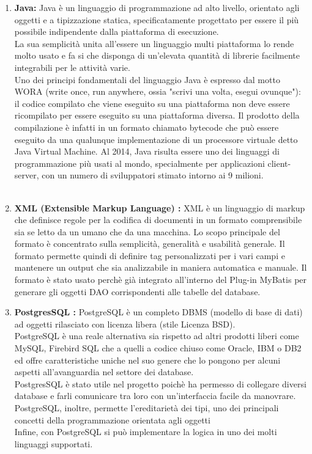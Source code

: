 \begin{enumerate}

\item \textbf{Java: }Java è un linguaggio di programmazione ad alto livello, orientato agli oggetti e a tipizzazione statica, specificatamente progettato per essere il più possibile indipendente dalla piattaforma di esecuzione.\\
La sua semplicità unita all'essere un linguaggio multi piattaforma lo rende molto usato e fa si che disponga di un'elevata quantità di librerie facilmente integrabili per le attività varie.\\
Uno dei principi fondamentali del linguaggio Java è espresso dal motto WORA (write once, run anywhere, ossia "scrivi una volta, esegui ovunque"): il codice compilato che viene eseguito su una piattaforma non deve essere ricompilato per essere eseguito su una piattaforma diversa. Il prodotto della compilazione è infatti in un formato chiamato bytecode che può essere eseguito da una qualunque implementazione di un processore virtuale detto Java Virtual Machine. 
Al 2014, Java risulta essere uno dei linguaggi di programmazione più usati al mondo, specialmente per applicazioni client-server, con un  numero di sviluppatori stimato intorno ai 9 milioni.\\\\

\item \textbf{XML (Extensible Markup Language) : }XML è un linguaggio di markup che definisce regole per la codifica di documenti in un formato comprensibile sia se letto da un umano che da una macchina. Lo scopo principale del formato è concentrato sulla semplicità, generalità e usabilità generale. Il formato permette quindi di definire tag personalizzati per i vari campi e mantenere un output che sia analizzabile in maniera automatica e manuale.
Il formato è stato usato perchè già integrato all'interno del Plug-in MyBatis per generare gli oggetti DAO corrispondenti alle tabelle del database.

\item \textbf{PostgresSQL :}
PostgreSQL è un completo DBMS (modello di base di dati) ad oggetti rilasciato con licenza libera (stile Licenza BSD).\\
PostgreSQL è una reale alternativa sia rispetto ad altri prodotti liberi come MySQL, Firebird SQL che a quelli a codice chiuso come Oracle, IBM o DB2 ed offre caratteristiche uniche nel suo genere che lo pongono per alcuni aspetti all'avanguardia nel settore dei database.\\
PostgresSQL è stato utile nel progetto poichè ha permesso di collegare diversi database e farli comunicare tra loro con un'interfaccia facile da manovrare.\\
PostgreSQL, inoltre, permette l'ereditarietà dei tipi, uno dei principali concetti della programmazione orientata agli oggetti\\
Infine, con PostgreSQL si può implementare la logica in uno dei molti linguaggi supportati.


\end{enumerate}
